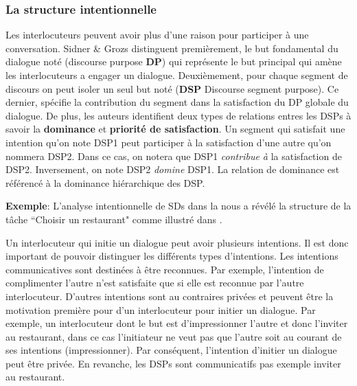 \documentclass[a4paper,french]{article}
\begin{document}
\subsubsection{La structure intentionnelle} 
Les interlocuteurs peuvent avoir plus d'une raison pour participer à une conversation. Sidner \& Grozs distinguent premièrement, le but fondamental du dialogue noté (discourse purpose \textbf{DP}) qui représente le but principal qui amène les interlocuteurs a engager un dialogue. Deuxièmement, pour chaque segment de discours on peut isoler un seul but noté (\textbf{DSP} Discourse segment purpose). Ce dernier, spécifie la contribution du segment dans la satisfaction du DP globale du dialogue. De plus, les auteurs identifient deux types de relations entres les DSPs à savoir la \textbf{dominance} et \textbf{priorité de satisfaction}. Un segment qui satisfait une intention qu'on note DSP1 peut participer à la satisfaction d'une autre qu'on nommera DSP2. Dans ce cas, on notera que DSP1 \textit{contribue à} la satisfaction de DSP2. Inversement, on note DSP2 \textit{domine} DSP1. La relation de dominance est référencé à la dominance hiérarchique des DSP.

\par \textbf{Exemple}: L'analyse intentionnelle de SDs dans la  nous a révélé la structure de la tâche ``Choisir un restaurant" comme illustré dans .

\begin{figure}
	\vskip 8pt
\end{figure}


\par Un interlocuteur qui initie un dialogue peut avoir plusieurs intentions. Il est donc important de pouvoir distinguer les différents types d'intentions. Les intentions communicatives sont destinées à être reconnues. Par exemple, l'intention de complimenter l'autre n'est satisfaite que si elle est reconnue par l'autre interlocuteur. D'autres intentions sont au contraires privées et peuvent être la motivation première pour d'un interlocuteur pour initier un dialogue. Par exemple, un interlocuteur dont le but est d'impressionner l'autre et donc l'inviter au restaurant, dans ce cas l'initiateur ne veut pas que l'autre soit au courant de ses intentions (impressionner). Par conséquent, l'intention d'initier un dialogue peut être privée. En revanche, les DSPs sont communicatifs pas exemple inviter au restaurant. 
\end{document}
